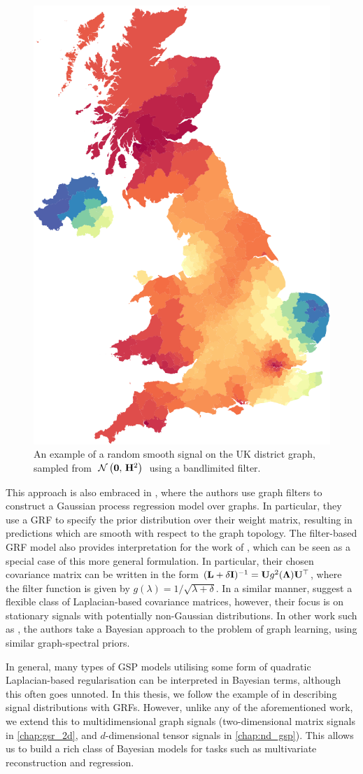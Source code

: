     \begin{figure}[t]
        \vspace*{0.6cm}
	\centering
		\includegraphics[width=0.4\linewidth]{Figures/uk_smooth.pdf}
	\caption[An example of a random smooth graph signal]{An example of a random smooth signal on the UK district graph, sampled from $\; \mathcal{N}\left(\mathbf{0}, \, \mathbf{H}^2\right) \;$ using a bandlimited filter. }
	\label{fig:random_smooth_uk}
    \vspace*{0.6cm}
    \end{figure}

This approach is also embraced in \cite{Venkitaraman2020}, where the authors use graph filters to construct a Gaussian process regression model over graphs. In particular, they use a GRF to specify the prior distribution over their weight matrix, resulting in predictions which are smooth with respect to the graph topology. The filter-based GRF model also provides interpretation for the work of \cite{Gadde2015}, which can be seen as a special case of this more general formulation. In particular, their chosen covariance matrix can be written in the form $(\mathbf{L} + \delta \mathbf{I})^{-1} = \mathbf{U} g^2(\mathbf{\Lambda}) \mathbf{U}^\top$, where the filter function is given by $g(\lambda) = 1 / \sqrt{\lambda + \delta}$. In a similar manner, \citep{Perraudin2017} suggest a flexible class of Laplacian-based covariance matrices, however, their focus is on stationary signals with potentially non-Gaussian distributions. In other work such as \cite{Dong2016}, the authors take a Bayesian approach to the problem of graph learning, using similar graph-spectral priors. 

In general, many types of GSP models utilising some form of quadratic Laplacian-based regularisation can be interpreted in Bayesian terms, although this often goes unnoted. In this thesis, we follow the example of \cite{Zhang2015} in describing signal distributions with GRFs. However, unlike any of the aforementioned work, we extend this to multidimensional graph signals (two-dimensional matrix signals in \cref{chap:gsr_2d}, and $d$-dimensional tensor signals in \cref{chap:nd_gsp}). This allows us to build a rich class of Bayesian models for tasks such as multivariate reconstruction and regression. 

